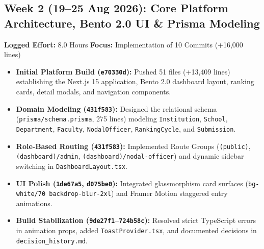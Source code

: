 \documentclass[11pt,a4paper]{article}
\begin{document}
\subsection*{Week 2 (19--25 Aug 2026): Core Platform Architecture, Bento 2.0 UI \& Prisma Modeling}
\textbf{Logged Effort:} 8.0 Hours \quad \textbf{Focus:} Implementation of 10 Commits (+16,000 lines)
\begin{itemize}[leftmargin=1.4em, itemsep=2pt]
\item \textbf{Initial Platform Build (\texttt{e70330d}):} Pushed 51 files (+13,409 lines) establishing the Next.js 15 application, Bento 2.0 dashboard layout, ranking cards, detail modals, and navigation components.
\item \textbf{Domain Modeling (\texttt{431f583}):} Designed the relational schema (\texttt{prisma/schema.prisma}, 275 lines) modeling \texttt{Institution}, \texttt{School}, \texttt{Department}, \texttt{Faculty}, \texttt{NodalOfficer}, \texttt{RankingCycle}, and \texttt{Submission}.
\item \textbf{Role-Based Routing (\texttt{431f583}):} Implemented Route Groups (\texttt{(public)}, \texttt{(dashboard)/admin}, \texttt{(dashboard)/nodal-officer}) and dynamic sidebar switching in \texttt{DashboardLayout.tsx}.
\item \textbf{UI Polish (\texttt{1de67a5}, \texttt{d075be0}):} Integrated glassmorphism card surfaces (\texttt{bg-white/70 backdrop-blur-2xl}) and Framer Motion staggered entry animations.
\item \textbf{Build Stabilization (\texttt{9de27f1}--\texttt{724b58c}):} Resolved strict TypeScript errors in animation props, added \texttt{ToastProvider.tsx}, and documented decisions in \texttt{decision\_history.md}.
\end{itemize}
\end{document}
